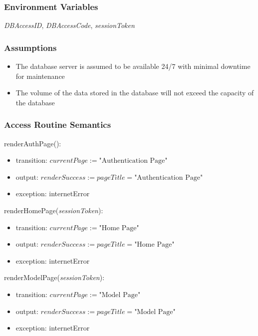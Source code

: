 \documentclass[12pt, titlepage]{article}
\begin{document}
\subsubsection{Environment Variables}

\textit{DBAccessID}, \textit{DBAccessCode}, \textit{sessionToken}

\subsubsection{Assumptions}

\begin{itemize}
  \item The database server is assumed to be available 24/7 with minimal downtime for maintenance 
  \item The volume of the data stored in the database will not exceed the capacity of the database
\end{itemize}

\subsubsection{Access Routine Semantics}

\noindent renderAuthPage():
\begin{itemize}
\item transition: \(currentPage := \text{"Authentication Page"}\)
\item output: \(renderSuccess := pageTitle = \text{"Authentication Page"}\)
\item exception: internetError
\end{itemize}

\noindent renderHomePage(\textit{sessionToken}):
\begin{itemize}
\item transition: \(currentPage := \text{"Home Page"}\)
\item output: \(renderSuccess := pageTitle = \text{"Home Page"}\)
\item exception: internetError
\end{itemize}

\noindent renderModelPage(\textit{sessionToken}):
\begin{itemize}
\item transition: \(currentPage := \text{"Model Page"}\)
\item output: \(renderSuccess := pageTitle = \text{"Model Page"}\)
\item exception: internetError
\end{itemize}
\end{document}
